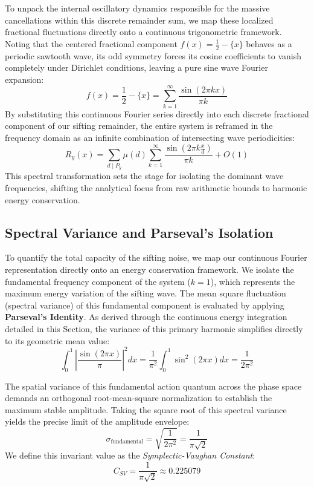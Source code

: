 \documentclass[sn-mathphys-num, pdflatex]{sn-jnl}
\begin{document}
To unpack the internal oscillatory dynamics responsible for the massive cancellations within this discrete remainder sum, we map these localized fractional fluctuations directly onto a continuous trigonometric framework. Noting that the centered fractional component $f(x) = \frac{1}{2} - \{x\}$ behaves as a periodic sawtooth wave, its odd symmetry forces its cosine coefficients to vanish completely under Dirichlet conditions, leaving a pure sine wave Fourier expansion:
\begin{equation*}
f(x) = \frac{1}{2} - \{x\} = \sum_{k=1}^{\infty} \frac{\sin(2\pi k x)}{\pi k} 
\end{equation*}
By substituting this continuous Fourier series directly into each discrete fractional component of our sifting remainder, the entire system is reframed in the frequency domain as an infinite combination of intersecting wave periodicities:
\begin{equation*}
R_y(x) = \sum_{d \mid P_y} \mu(d) \sum_{k=1}^{\infty} \frac{\sin\left(2\pi k \frac{x}{d}\right)}{\pi k} + O(1) 
\end{equation*}
This spectral transformation sets the stage for isolating the dominant wave frequencies, shifting the analytical focus from raw arithmetic bounds to harmonic energy conservation.

\subsection{Spectral Variance and Parseval's Isolation}
To quantify the total capacity of the sifting noise, we map our continuous Fourier representation directly onto an energy conservation framework. We isolate the fundamental frequency component of the system ($k=1$), which represents the maximum energy variation of the sifting wave. The mean square fluctuation (spectral variance) of this fundamental component is evaluated by applying \textbf{Parseval's Identity}. As derived through the continuous energy integration detailed in this Section, the variance of this primary harmonic simplifies directly to its geometric mean value:
\begin{equation*}
\int_{0}^{1} \left| \frac{\sin(2\pi x)}{\pi} \right|^2 dx = \frac{1}{\pi^2} \int_{0}^{1} \sin^2(2\pi x) dx = \frac{1}{2\pi^2}
\end{equation*}

The spatial variance of this fundamental action quantum across the phase space demands an orthogonal root-mean-square normalization to establish the maximum stable amplitude. Taking the square root of this spectral variance yields the precise limit of the amplitude envelope:
\begin{equation*}
\sigma_{\text{fundamental}} = \sqrt{\frac{1}{2\pi^2}} = \frac{1}{\pi\sqrt{2}}
\end{equation*}
We define this invariant value as the \textit{Symplectic-Vaughan Constant}:
\begin{equation*}
C_{SV} = \frac{1}{\pi\sqrt{2}} \approx 0.225079
\end{equation*}
\end{document}
